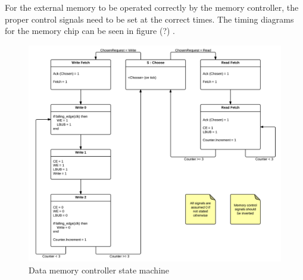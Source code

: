 For the external memory to be operated correctly by the memory controller, the proper control signals need to be set at the correct times.
The timing diagrams for the memory chip can be seen in figure (?) .

\begin{figure}

  \centering
  \includegraphics[width=\textwidth]{fpga/fig/memory_ctrl_state_machine.png}
  \caption{Data memory controller state machine}
  \label{fpga:fig:mem:data_memory_ctrl}
\end{figure}
